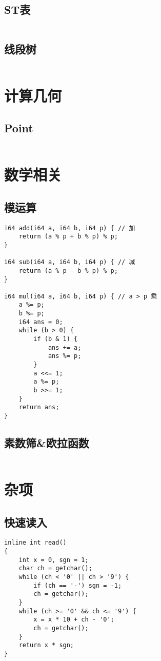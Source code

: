 \documentclass[a4paper, 10pt]{paper}
\newcommand{\cpp}[1]{\inputminted[frame=single, linenos=true]{cpp}{#1}}
\begin{document}
        \subsection{ST表}
        \cpp{../ST.cpp}

        \subsection{线段树}
        \cpp{../SegTree.cpp}

    \section{计算几何}
        \subsection{Point}
        \cpp{../Point.cpp}

    \section{数学相关}
        \subsection{模运算}
        \begin{verbatim}
i64 add(i64 a, i64 b, i64 p) { // 加
    return (a % p + b % p) % p;
}

i64 sub(i64 a, i64 b, i64 p) { // 减
    return (a % p - b % p) % p;
}

i64 mul(i64 a, i64 b, i64 p) { // a > p 乘
    a %= p;
    b %= p;
    i64 ans = 0;
    while (b > 0) {
        if (b & 1) {
            ans += a;
            ans %= p;
        }
        a <<= 1;
        a %= p;
        b >>= 1;
    }
    return ans;
}
        \end{verbatim}

        \subsection{素数筛\&欧拉函数}
        \cpp{"../素数筛&欧拉函数.cpp"}

    \section{杂项}
        \subsection{快速读入}
        \begin{verbatim}
inline int read()
{
    int x = 0, sgn = 1;
    char ch = getchar();
    while (ch < '0' || ch > '9') {
        if (ch == '-') sgn = -1;
        ch = getchar();
    }
    while (ch >= '0' && ch <= '9') {
        x = x * 10 + ch - '0';
        ch = getchar();
    }
    return x * sgn;
}
        \end{verbatim}
\end{document}
